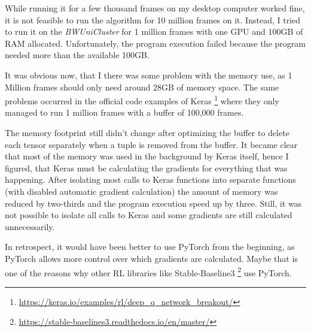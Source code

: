 \documentclass[a4paper,12pt,
headsepline,           %
oneside,               %
bibtotoc,              %
]{scrbook}
\begin{document}
While running it for a few thousand frames on my desktop computer worked fine, it is not feasible to run the algorithm for 10 million frames on it. Instead, I tried to run it on the \emph{BWUniCluster} for 1 million frames with one GPU and 100GB of RAM allocated. Unfortunately, the program execution failed because the program needed more than the available 100GB.

It was obvious now, that I there was some problem with the memory use, as 1 Million frames should only need around 28GB of memory space. The same problems occurred in the official code examples of Keras%
\footnote{\url{https://keras.io/examples/rl/deep_q_network_breakout/}} %
where they only managed to run 1 million frames with a buffer of 100,000 frames.

The memory footprint still didn't change after optimizing the buffer to delete each tensor separately when a tuple is removed from the buffer. It became clear that most of the memory was used in the background by Keras itself, hence I figured, that Keras must be calculating the gradients for everything that was happening. After isolating most calls to Keras functions into separate functions (with disabled automatic gradient calculation) the amount of memory was reduced by two-thirds and the program execution speed up by three. Still, it was not possible to isolate all calls to Keras and some gradients are still calculated unnecessarily.

In retrospect, it would have been better to use PyTorch from the beginning, as PyTorch allows more control over which gradients are calculated. Maybe that is one of the reasons why other RL libraries like Stable-Baseline3%
\footnote{\url{https://stable-baselines3.readthedocs.io/en/master/}} %
use PyTorch.



\cleardoublepage
\backmatter

\clearpage
\renewcommand*{\bibfont}{\small}
\printbibliography
\end{document}
